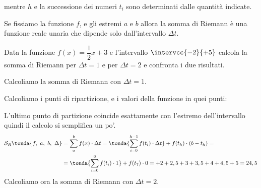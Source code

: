 \vspace{-.5em}
\noindent mentre \(h\) e la successione dei numeri \(t_i\) sono determinati 
dalle quantità indicate. 

Se fissiamo la funzione \(f\), e gli estremi \(a\) e \(b\) allora la somma di 
Riemann è una funzione reale unaria che dipende solo dall'intervallo  
\(\Delta t\). 

\begin{esempio}
Data la funzione \(f(x) = \dfrac{1}{2}x +3\) e 
l'intervallo \(\intervcc{-2}{+5}\)
calcola la somma di Riemann per \(\Delta t = 1\) e
per \(\Delta t = 2\) e confronta i due risultati.

Calcoliamo la somma di Riemann con \(\Delta t = 1\).

Calcoliamo i punti di ripartizione, e i valori della funzione in quei 
punti:


L'ultimo punto di partizione coincide esattamente con l'estremo 
dell'intervallo quindi il calcolo si semplifica un po'.
\begin{align*}
\mathcal{S}_R \tonda{f,~a,~b,~\Delta} &= \sum_a^b f(x) \cdot \Delta t =
   \tonda{\sum_{i=0}^{h -1} f(t_i) \cdot \Delta t} +f(t_h)\cdot(b-t_h) = \\
&= \tonda{\sum_{i=0}^{6} f(t_i) \cdot 1} +f(t_7) \cdot 0 = 
   +2+2,5+3+3,5+4+4,5+5 = 24,5
\end{align*}
Calcoliamo ora la somma di Riemann con \(\Delta t = 2\).


\end{esempio}
